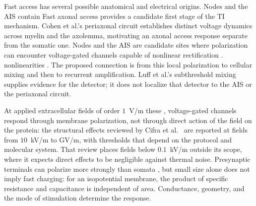 \documentclass[11pt,a4paper]{article}
\providecommand{\DIFaddtex}[1]{{\protect\color{blue} \sf #1}} %
\providecommand{\DIFdeltex}[1]{{\protect\color{red} \scriptsize #1}} %
\providecommand{\DIFaddbegin}{} %
\providecommand{\DIFaddend}{} %
\providecommand{\DIFdelbegin}{} %
\providecommand{\DIFdelend}{} %
\providecommand{\DIFadd}[1]{\texorpdfstring{\DIFaddtex{#1}}{#1}} %
\providecommand{\DIFdel}[1]{\texorpdfstring{\DIFdeltex{#1}}{}} %
\begin{document}
\DIFdel{Fast access has several possible anatomical and electrical origins. Nodes and the
AIS contain }\DIFdelend \DIFaddbegin \DIFadd{Fast axonal access provides a candidate first stage of the TI mechanism.
Cohen et al.'s periaxonal circuit \cite{cohen2020periaxonal} establishes distinct
voltage dynamics across myelin and the axolemma, motivating an axonal access
response separate from the somatic one. Nodes and the AIS are candidate sites
where polarization can encounter }\DIFaddend voltage-gated \DIFdelbegin \DIFdel{channels capable of nonlinear rectification
\cite{mirzakhalili2020,wang2023}.
}\DIFdelend \DIFaddbegin \DIFadd{nonlinearities
\cite{kole2008ais,mirzakhalili2020,wang2023}. The proposed connection is from this
local polarization to cellular mixing and then to recurrent amplification.
Luff et al.'s subthreshold mixing \cite{luff2024mixer} supplies evidence for the
detector; it does not localize that detector to the AIS or the periaxonal circuit.
}

\DIFaddend At applied extracellular fields of order $1$~V/m\DIFdelbegin \DIFdel{these
}\DIFdelend \DIFaddbegin \DIFadd{, voltage-gated
}\DIFaddend channels respond through membrane polarization, not through direct action of the
field on the protein: the structural effects reviewed by Cifra et al.\
\cite{cifra2026} are reported at fields from $10$~kV/m to GV/m, with thresholds
that depend on the protocol and molecular system. That review places
fields below $0.1$~kV/m outside its scope, where it expects direct effects to be
negligible against thermal noise. Presynaptic terminals can polarize more strongly
than somata \cite{rahman2013,aberra2023,chakraborty2018}, but small size alone does
not imply fast charging: for an isopotential membrane, the product of specific
resistance and capacitance is independent of area. Conductance, geometry, and the
mode of stimulation determine the response.
\end{document}
